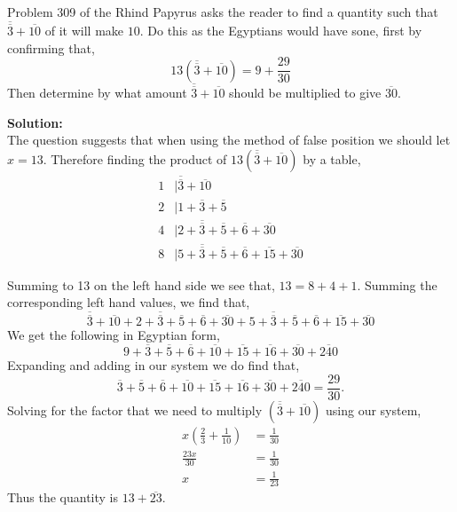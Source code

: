 \documentclass[12pt]{article}
\makeatletter
\theoremstyle{homework}
\newenvironment{exercise}[1]
{\def\@currentlabel{#1}\exercisecore}
{\endexercisecore}
\newcommand{\localhead}[1]{\par\smallskip\noindent\textbf{#1}\nobreak\\}%
\newcommand\solution{\localhead{Solution:}}
\makeatother
\begin{document}
    \begin{exercise}{5} Problem 309 of the Rhind Papyrus asks the reader to find a quantity such that $\overline{\overline{3}} + \overline{10}$
        of it will make $10$. Do this as the Egyptians would have sone, first by confirming that, 
        \begin{equation*}
            13(\overline{\overline{3}} + \overline{10}) = 9 + \frac{29}{30}
        \end{equation*}
        Then determine by what amount $\overline{\overline{3}} + \overline{10}$ should be multiplied to give $\overline{30}$.
        \solution The question suggests that when using the method of false position we should let $x = 13$. Therefore finding the product of $13(\overline{\overline{3}} + \overline{10})$
        by a table, 
        \begin{align*}
            1 &|\overline{\overline{3}} + \overline{10}\\
            2 &|1 + \overline{3} + \overline{5}\\
            4 &|2 + \overline{\overline{3}} + \overline{5} + \overline{6} + \overline{30}\\
            8 &|5 + \overline{\overline{3}} + \overline{5} + \overline{6} + \overline{15} + \overline{30}
        \end{align*}
       
        Summing to 13 on the left hand side we see that, $13 = 8 + 4 + 1$. Summing the corresponding left hand values, we find that,
        \begin{equation*}
            \overline{\overline{3}} + \overline{10} + 2 + \overline{\overline{3}} + \overline{5} + \overline{6} + \overline{30} + 5 + \overline{\overline{3}} + \overline{5} + \overline{6} + \overline{15} + \overline{30}
        \end{equation*}
        We get the following in Egyptian form, 
        \begin{equation*}
            9 + \overline{3} + \overline{5} + \overline{6} + \overline{10} + \overline{15} + \overline{16}+ \overline{30} + \overline{240} 
         \end{equation*}
         Expanding and adding in our system we do find that,
         \begin{equation*}
            \overline{3} + \overline{5} + \overline{6} + \overline{10} + \overline{15} + \overline{16}+ \overline{30} + \overline{240}  = \frac{29}{30}.
         \end{equation*}
         Solving for the factor that we need to multiply $(\overline{\overline{3}} + \overline{10})$ using our system, 
         \begin{align*}
             x(\frac{2}{3}+ \frac{1}{10}) &= \frac{1}{30}\\
             \frac{23x}{30} &= \frac{1}{30}\\
             x &= \frac{1}{23}
         \end{align*}
         Thus the quantity is $13 + \overline{23}$.
    \end{exercise}
\end{document}
